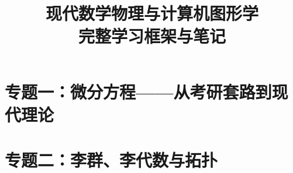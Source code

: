 \documentclass[11pt,a4paper]{article}
\title{\textbf{现代数学物理与计算机图形学\\完整学习框架与笔记}}
\author{}
\date{}
\begin{document}
\maketitle
\tableofcontents
\newpage
















\clearpage
\part{专题一：微分方程——从考研套路到现代理论}





\clearpage
\part{专题二：李群、李代数与拓扑}



\end{document}
